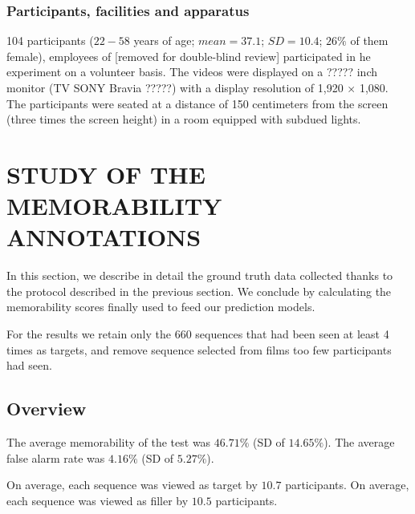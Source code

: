\documentclass[sigconf]{acmart}
\begin{document}
\subsubsection{Participants, facilities and apparatus}
104 participants ($22-58$ years of age; $mean = 37.1 $; $SD = 10.4 $; $26\%$ of them female), employees of [removed for double-blind review] participated in he experiment on a volunteer basis. %
The videos were displayed on a ????? inch monitor (TV SONY Bravia ?????) with a display resolution of 1,920 $\times$ 1,080. The participants were seated at a distance of 150 centimeters from the screen (three times the screen height) in a room equipped with subdued lights.

\section{STUDY OF THE MEMORABILITY ANNOTATIONS}
In this section, we describe in detail the ground truth data collected thanks to the protocol described in the previous section.
We conclude by calculating the memorability scores finally used to feed our prediction models.

For the results we retain only the 660 sequences that had been seen at least 4 times as targets, and remove sequence selected from films too few participants had seen.



\subsection{Overview}
The average memorability of the test was $46.71\%$ (SD of $14.65\%$). The average false alarm rate was $4.16\%$ (SD of $5.27\%$).


On average, each sequence was viewed as target by $10.7$ participants. 
On average, each sequence was viewed as filler by $10.5$ participants. 
\end{document}
